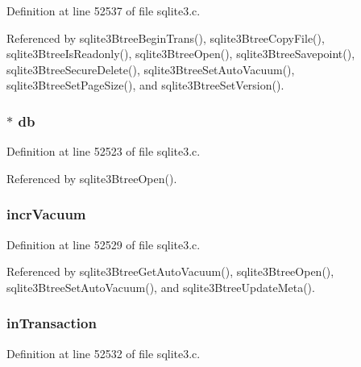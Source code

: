 Definition at line 52537 of file sqlite3.\+c.



Referenced by sqlite3\+Btree\+Begin\+Trans(), sqlite3\+Btree\+Copy\+File(), sqlite3\+Btree\+Is\+Readonly(), sqlite3\+Btree\+Open(), sqlite3\+Btree\+Savepoint(), sqlite3\+Btree\+Secure\+Delete(), sqlite3\+Btree\+Set\+Auto\+Vacuum(), sqlite3\+Btree\+Set\+Page\+Size(), and sqlite3\+Btree\+Set\+Version().

\hypertarget{struct_bt_shared_ad6e663497d2c934364b3bcf07496b30b}{}
\subsubsection[{db}]{$\ast$ db}\label{struct_bt_shared_ad6e663497d2c934364b3bcf07496b30b}


Definition at line 52523 of file sqlite3.\+c.



Referenced by sqlite3\+Btree\+Open().

\hypertarget{struct_bt_shared_a04b3f93f1a63c4f95f0346725fa8054c}{}
\subsubsection[{incr\+Vacuum}]{ incr\+Vacuum}\label{struct_bt_shared_a04b3f93f1a63c4f95f0346725fa8054c}


Definition at line 52529 of file sqlite3.\+c.



Referenced by sqlite3\+Btree\+Get\+Auto\+Vacuum(), sqlite3\+Btree\+Open(), sqlite3\+Btree\+Set\+Auto\+Vacuum(), and sqlite3\+Btree\+Update\+Meta().

\hypertarget{struct_bt_shared_ab3bcd3a6018a915020d48ef2f008f9a2}{}
\subsubsection[{in\+Transaction}]{ in\+Transaction}\label{struct_bt_shared_ab3bcd3a6018a915020d48ef2f008f9a2}


Definition at line 52532 of file sqlite3.\+c.



